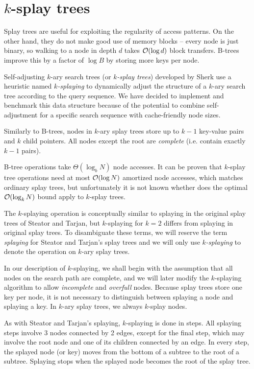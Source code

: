 \chapter{$k$-splay trees}
Splay trees are useful for exploiting the regularity of access patterns.
On the other hand, they do not make good use of memory blocks -- every node
is just binary, so walking to a node in depth $d$ takes $\mathcal{O}(\log d)$ block
transfers. B-trees improve this by a factor of $\log B$ by storing more keys
per node.

Self-adjusting $k$-ary search trees (or \textit{$k$-splay trees}) developed
by Sherk\cite{ksplay-sherk} use a heuristic named \textit{$k$-splaying}
to dynamically adjust the structure of a $k$-ary search tree according to
the query sequence. We have decided to implement and benchmark this data
structure because of the potential to combine self-adjustment for a specific
search sequence with cache-friendly node sizes.

Similarly to B-trees, nodes in $k$-ary splay trees store up to $k-1$ key-value
pairs and $k$ child pointers. All nodes except the root are \textit{complete}
(i.e. contain exactly $k-1$ pairs).

B-tree operations take $\Theta(\log_b N)$ node accesses. It can be proven that
$k$-splay tree operations need at most $\mathcal{O}(\log N)$ amortized node accesses,
which matches ordinary splay trees, but unfortunately it is not known whether
does the optimal $\mathcal{O}(\log_k N)$ bound apply to $k$-splay trees.

The $k$-splaying operation is conceptually similar to splaying in the original
splay trees of Steator and Tarjan, but $k$-splaying for $k=2$ differs from
splaying in original splay trees. To disambiguate these terms, we will
reserve the term \textit{splaying} for Steator and Tarjan's splay trees and
we will only use \textit{$k$-splaying} to denote the operation
on $k$-ary splay trees.

In our description of $k$-splaying, we shall begin with the assumption that
all nodes on the search path are complete, and we will later modify
the $k$-splaying algorithm to allow \textit{incomplete} and \textit{overfull}
nodes.
Because splay trees store one key per node, it is not necessary to distinguish
between splaying a node and splaying a key. In $k$-ary splay trees, we always
$k$-splay nodes.

As with Steator and Tarjan's splaying, $k$-splaying is done in steps.
All splaying steps involve 3 nodes connected by 2 edges, except for the final
step, which may involve the root node and one of its children connected by
an edge. In every step, the splayed node (or key) moves from the bottom
of a subtree to the root of a subtree. Splaying stops when the splayed node
becomes the root of the splay tree.

